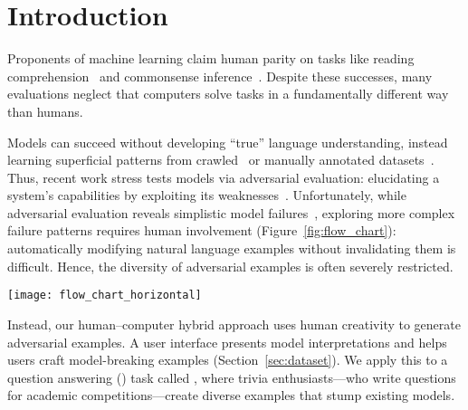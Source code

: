 \section{Introduction}
\label{sec:introduction}

Proponents of machine learning claim human
parity on tasks like reading comprehension~\cite{yu2018qanet}
and commonsense
inference~\cite{devlin2018BERT}. Despite these successes,
many evaluations neglect that computers solve  tasks 
in a fundamentally different way than humans.  

Models can succeed without developing ``true'' language understanding,
instead learning superficial patterns from
crawled~\cite{chen2016thorough} or manually annotated
datasets~\cite{kaushik2018reading,gururangan2018annotation}.  Thus,
recent work stress tests models via adversarial evaluation:
elucidating a system's capabilities by exploiting its
weaknesses~\cite{jia2017adversarial,belinkov2019survey}.
Unfortunately, while adversarial evaluation reveals simplistic model
failures~\cite{ribeiro2018sear,mudrakarta2018understand}, exploring
more complex failure patterns requires human involvement (Figure~\ref{fig:flow_chart}):
automatically modifying natural language examples
without invalidating them is difficult. Hence, the diversity
of adversarial examples is often severely restricted.
	
\begin{figure*}[t]
\centering
\texttt{[image: flow\_chart\_horizontal]}
\caption{Adversarial evaluation in  typically focuses on a specific
  phenomenon (e.g., word replacements) and then generates the corresponding examples (top).
  Consequently, adversarial examples are limited to
  the diversity of what the underlying generative model or perturbation rule can produce, and also require downstream
  human evaluation to ensure validity. Our setup (bottom) instead has
  human-authored examples, using human--computer collaboration to craft adversarial examples with greater diversity.}
\label{fig:flow_chart}
\end{figure*}

Instead, our human--computer hybrid approach uses human creativity to
generate adversarial examples.  A user interface presents model
interpretations and helps users craft model-breaking examples
(Section~\ref{sec:dataset}).  We apply this to a question answering
() task called \qb{}, where trivia enthusiasts---who write
questions for academic competitions---create diverse examples
that stump existing  models.

